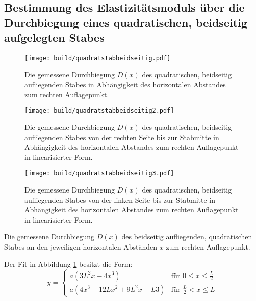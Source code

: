\subsection{Bestimmung des Elastizitätsmoduls über die Durchbiegung eines quadratischen, beidseitig aufgelegten Stabes}

\begin{figure}
	\centering
	\caption{Die gemessene Durchbiegung $D(x)$ des quadratischen, beidseitig aufliegenden Stabes
	 in Abhängigkeit des horizontalen Abstandes zum rechten Auflagepunkt.}
	\texttt{[image: build/quadratstabbeidseitig.pdf]}
	\label{fig:beidseitig}
\end{figure}
\begin{figure}
	\centering
	\caption{Die gemessene Durchbiegung $D(x)$ des quadratischen, beidseitig aufliegenden Stabes von der rechten Seite bis zur Stabmitte
	 in Abhängigkeit des horizontalen Abstandes zum rechten Auflagepunkt in linearisierter Form.}
	\texttt{[image: build/quadratstabbeidseitig2.pdf]}
	\label{fig:beidseitiglinear1}
\end{figure}
\begin{figure}
	\centering
	\caption{Die gemessene Durchbiegung $D(x)$ des quadratischen, beidseitig aufliegenden Stabes von der linken Seite bis zur Stabmitte
	 in Abhängigkeit des horizontalen Abstandes zum rechten Auflagepunkt in linearisierter Form.}
	\texttt{[image: build/quadratstabbeidseitig3.pdf]}
	\label{fig:beidseitiglinear2}
\end{figure}
\begin{table}
	\caption{Die gemessene Durchbiegung $D(x)$ des beidseitig aufliegenden, quadratischen Stabes an den jeweiligen horizontalen Abständen $x$ zum rechten Auflagepunkt.}
	\begin{minipage}[c]{0.5\textwidth}
		\centering
		
	\end{minipage}
	\begin{minipage}[c]{0.5\textwidth}
		\centering
		
	\end{minipage}
\end{table}
Der Fit in Abbildung \ref{fig:beidseitig} besitzt die Form:
\begin{equation}
	y = 
	\begin{cases}
	a\left(3L^2 x-4x^3\right)& \text{für }0\leq x \leq \frac{L}{2} \\ 
	a\left(4 x^3 -12 L x^2 + 9 L^2 x -L 3 \right)& \text{für }\frac{L}{2} < x \leq L 
	\end{cases} \label{FunktionBeidseitig}
\end{equation}
